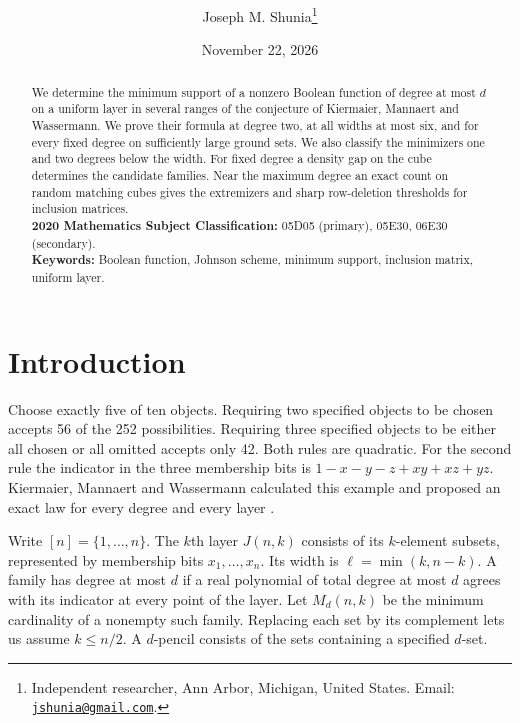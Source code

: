\documentclass[11pt,letterpaper]{article}
\title{\vspace{-1.5\baselineskip}%
  \manuscripttitle}
\author{Joseph M. Shunia\thanks{Independent researcher, Ann Arbor, Michigan, United States.
  Email: \href{mailto:jshunia@gmail.com}{\texttt{jshunia@gmail.com}}.}}
\date{November 22, 2026}
\newcommand{\manuscriptkeywords}{Boolean function, Johnson scheme, minimum support, inclusion matrix, uniform layer}
\numberwithin{equation}{section}
\begin{document}
\maketitle
\vspace{-\baselineskip}

\begin{abstract}
We determine the minimum support of a nonzero Boolean function of degree at most $d$ on a
uniform layer in several ranges of the conjecture of Kiermaier, Mannaert and Wassermann. We
prove their formula at degree two, at all widths at most six, and for every fixed degree on
sufficiently large ground sets. We also classify the minimizers one and two degrees below the
width. For fixed degree a density gap on the cube determines the candidate families. Near the
maximum degree an exact count on random matching cubes gives the extremizers and sharp
row-deletion thresholds for inclusion matrices.
\\[2mm]
{\bf 2020 Mathematics Subject Classification:} 05D05 (primary), 05E30, 06E30 (secondary).
\\[2mm]
{\bf Keywords:} \manuscriptkeywords.
\end{abstract}

\section{Introduction}\label{sec:intro}

Choose exactly five of ten objects. Requiring two specified objects to be chosen accepts 56 of
the 252 possibilities. Requiring three specified objects to be either all chosen or all
omitted accepts only 42. Both rules are quadratic. For the second rule the indicator in the
three membership bits is $1-x-y-z+xy+xz+yz$. Kiermaier, Mannaert and Wassermann calculated
this example and proposed an exact law for every degree and every layer \cite[Section 7]{kmw}.

Write $[n]=\{1,\ldots,n\}$. The $k$th layer $J(n,k)$ consists of its $k$-element subsets,
represented by membership bits $x_1,\ldots,x_n$. Its width is $\ell=\min(k,n-k)$. A family has
degree at most $d$ if a real polynomial of total degree at most $d$ agrees with its indicator
at every point of the layer. Let $M_{d}(n,k)$ be the minimum cardinality of a nonempty such
family. Replacing each set by its complement lets us assume $k\le n/2$. A $d$-pencil consists
of the sets containing a specified $d$-set.
\end{document}
